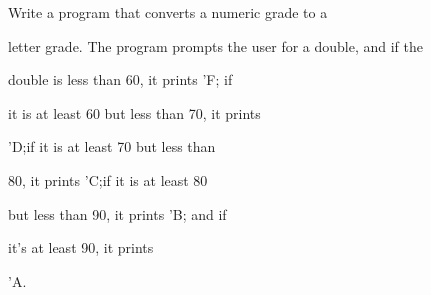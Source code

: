 Write a program that converts a numeric grade to a

letter grade. The program prompts the user for a double, and if the

double is less than 60, it prints 'F; if

it is at least 60 but less than 70, it prints

'D;if it is at least 70 but less than

80, it prints 'C;if it is at least 80

but less than 90, it prints 'B; and if

it's at least 90, it prints

'A.

